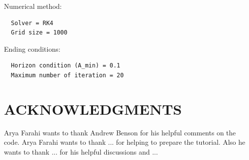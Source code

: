 \documentclass[12pt]{article}
\begin{document}
Numerical method:
\begin{verbatim}
  Solver = RK4
  Grid size = 1000
\end{verbatim}

Ending conditions:
\begin{verbatim}
  Horizon condition (A_min) = 0.1
  Maximum number of iteration = 20
\end{verbatim}


\section*{ACKNOWLEDGMENTS}
 Arya Farahi wants to thank Andrew Benson for his helpful comments on the code. Arya Farahi wants to thank ... for helping to prepare the tutorial. Also he wants to thank ... for his helpful discussions and ...
 
\end{document}
